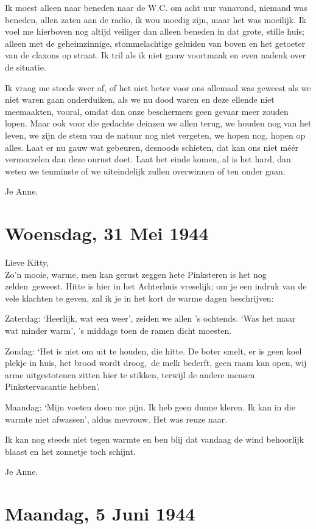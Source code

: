 \documentclass{book}
\begin{document}
Ik moest alleen naar beneden naar de W.C. om acht uur vanavond, niemand
was beneden, allen zaten aan de radio, ik wou moedig zijn, maar het was
moeilijk. Ik voel me hierboven nog altijd veiliger dan alleen beneden in
dat grote, stille huis; alleen met de geheimzinnige, stommelachtige
geluiden van boven en het getoeter van de claxons op straat. Ik tril als
ik niet gauw voortmaak en even nadenk over de situatie.

Ik vraag me steeds weer af, of het niet beter voor ons allemaal was
geweest als we niet waren gaan onderduiken, als we nu dood waren en deze
ellende niet meemaakten, vooral, omdat dan onze beschermers geen gevaar
meer zouden lopen. Maar ook voor die gedachte deinzen we allen terug, we
houden nog van het leven, we zijn de stem van de natuur nog niet
vergeten, we hopen nog, hopen op alles. Laat er nu gauw wat gebeuren,
desnoods schieten, dat kan ons niet méér vermorzelen dan deze onrust
doet. Laat het einde komen, al is het hard, dan weten we tenminste of we
uiteindelijk zullen overwinnen of ten onder gaan.

Je Anne.

\chapter{Woensdag, 31 Mei 1944}

Lieve Kitty,\\Zo'n mooie, warme, men kan gerust zeggen hete Pinksteren
is het nog zelden~geweest. Hitte is hier in het Achterhuis vreselijk; om
je een indruk van de vele klachten te geven, zal ik je in het kort de
warme dagen beschrijven:

Zaterdag: `Heerlijk, wat een weer', zeiden we allen 's ochtends. `Was
het maar wat minder warm', 's middags toen de ramen dicht moesten.

Zondag: `Het is niet om uit te houden, die hitte. De boter smelt, er is
geen koel plekje in huis, het brood wordt droog,~de melk bederft, geen
raam kan open, wij arme uitgestotenen zitten hier te stikken, terwijl de
andere mensen Pinkstervacantie hebben'.

Maandag: `Mijn voeten doen me pijn. Ik heb geen dunne kleren. Ik kan in
die warmte niet afwassen', aldus mevrouw. Het was reuze naar.

Ik kan nog steeds niet tegen warmte en ben blij dat vandaag de wind
behoorlijk blaast en het zonnetje toch schijnt.

Je Anne.

\chapter{Maandag, 5 Juni 1944}
\end{document}
